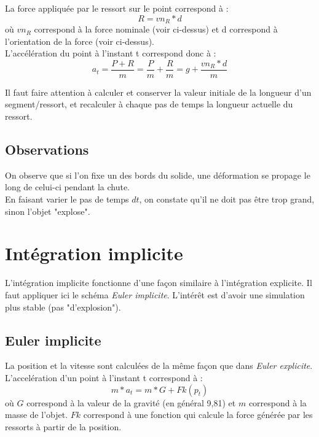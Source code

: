 \documentclass[a4paper]{article}
\begin{document}
La force appliquée par le ressort sur le point correspond à :
\begin{equation}
  R = vn_R * d
\end{equation}
où $vn_R$ correspond à la force nominale (voir ci-dessus) et d correspond à l'orientation de la force (voir ci-dessus).\\

L'accélération du point à l'instant t correspond donc à :
\begin{equation}
  a_t = \frac{P + R}{m} = \frac{P}{m} + \frac{R}{m} = g + \frac{vn_R * d}{m}
\end{equation}

Il faut faire attention à calculer et conserver la valeur initiale de la longueur d'un segment/ressort, et recalculer à chaque pas de temps la longueur actuelle du ressort.

\subsection{Observations}

On observe que si l'on fixe un des bords du solide, une déformation se propage le long de celui-ci pendant la chute.\\

En faisant varier le pas de temps $dt$, on constate qu'il ne doit pas être trop grand, sinon l'objet "explose".

\section{Intégration implicite}

L'intégration implicite fonctionne d'une façon similaire à l'intégration explicite. Il faut appliquer ici le schéma {\em Euler implicite}. L'intérêt est d'avoir une simulation plus stable (pas "d'explosion").\\

\subsection{Euler implicite}

La position et la vitesse sont calculées de la même façon que dans {\em Euler explicite}.\\

L'accelération d'un point à l'instant t correspond à :
\begin{equation}
  m * a_t = m * G + Fk(p_t)
\end{equation}
où $G$ correspond à la valeur de la gravité (en général 9,81) et $m$ correspond à la masse de l'objet. $Fk$ correspond à une fonction qui calcule la force générée par les ressorts à partir de la position.\\
\end{document}
